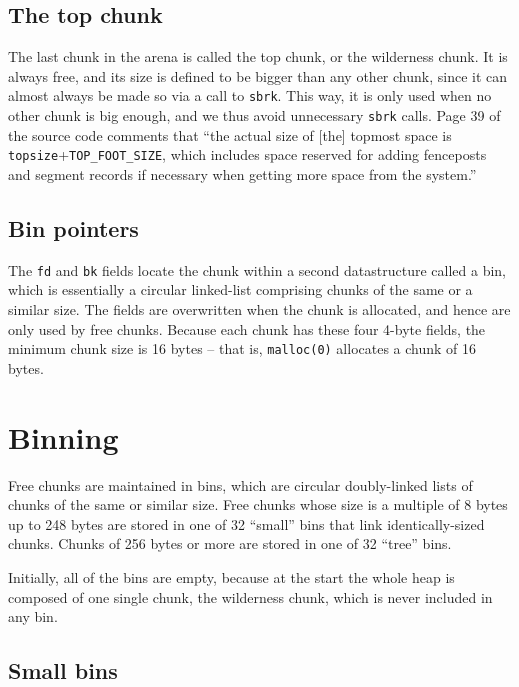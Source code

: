 \documentclass[12pt,a4paper]{article}
\theoremstyle{remark}
\begin{document}
\subsection{The top chunk}\label{sect:the_top_chunk}

The last chunk in the arena is called the top chunk, or the wilderness chunk. It is always free, and its size is defined to be bigger than any other chunk, since it can almost always be made so via a call to {\tt sbrk}. This way, it is only used when no other chunk is big enough, and we thus avoid unnecessary {\tt sbrk} calls. Page 39 of the source code comments that ``the actual size of [the] topmost space is {\tt topsize}+{\tt TOP\_FOOT\_SIZE}, which includes space reserved for adding fenceposts and segment records if necessary when getting more space from the system.''

\subsection{Bin pointers}

The {\tt fd} and {\tt bk} fields locate the chunk within a second datastructure called a bin, which is essentially a circular linked-list comprising chunks of the same or a similar size. The fields are overwritten when the chunk is allocated, and hence are only used by free chunks. Because each chunk has these four 4-byte fields, the minimum chunk size is 16 bytes -- that is, {\tt malloc(0)} allocates a chunk of 16 bytes.

\section{Binning}\label{sect:binning}

Free chunks are maintained in bins, which are circular doubly-linked lists of chunks of the same or similar size. Free chunks whose size is a multiple of 8 bytes up to 248 bytes are stored in one of 32 ``small'' bins that link identically-sized chunks. Chunks of 256 bytes or more are stored in one of 32 ``tree'' bins. 

Initially, all of the bins are empty, because at the start the whole heap is composed of one single chunk, the wilderness chunk, which is never included in any bin.

\subsection{Small bins}\label{sect:small_bins}
\end{document}

